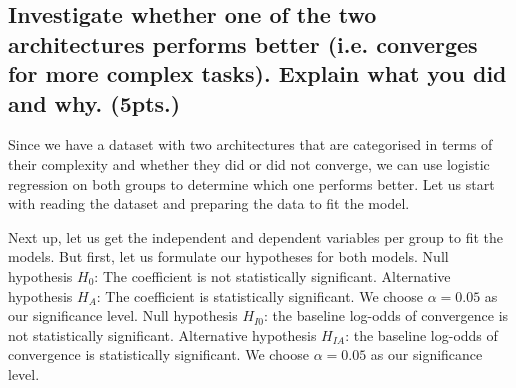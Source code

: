 \documentclass[a4paper]{article}
\begin{document}
\subsection{Investigate whether one of the two architectures performs better (i.e. converges for more complex tasks). Explain what you did and why. (5pts.)}
Since we have a dataset with two architectures that are categorised in terms of their complexity and whether they did or did not converge, we can use logistic regression on both groups to determine which one performs better. Let us start with reading the dataset and preparing the data to fit the model.
Next up, let us get the independent and dependent variables per group to fit the models. But first, let us formulate our hypotheses for both models. \newline\newline
Null hypothesis $H_0$: The coefficient is not statistically significant. \newline
Alternative hypothesis $H_A$: The coefficient is statistically significant. \newline
We choose $\alpha = 0.05$ as our significance level. \newline\newline
Null hypothesis $H_{I0}$: the baseline log-odds of convergence is not statistically significant. \newline
Alternative hypothesis $H_{IA}$: the baseline log-odds of convergence is statistically significant. \newline
We choose $\alpha = 0.05$ as our significance level. \newline\newline
{}
\end{document}
